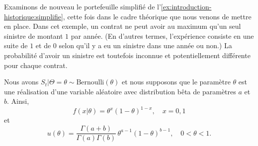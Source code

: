 \begin{exemple}
  \label{ex:bayesienne:bernoulli-beta}
  Examinons de nouveau le portefeuille simplifié de
  l'\autoref{ex:introduction-historique:simplifie}, cette fois dans le
  cadre théorique que nous venons de mettre en place. Dans cet
  exemple, un contrat ne peut avoir au maximum qu'un seul sinistre de
  montant $1$ par année. (En d'autres termes, l'expérience consiste en
  une suite de $1$ et de $0$ selon qu'il y a eu un sinistre dans une
  année ou non.) La probabilité d'avoir un sinistre est toutefois
  inconnue et potentiellement différente pour chaque contrat.

  Nous avons $S_t|\Theta = \theta \sim \text{Bernoulli}(\theta)$ et
  nous supposons que le paramètre $\theta$ est une réalisation d'une
  variable aléatoire avec distribution bêta de paramètres $a$ et
  $b$. Ainsi,
  \begin{equation*}
    f(x|\theta) = \theta^x (1 - \theta)^{1 - x},
    \quad x = 0, 1
  \end{equation*}
  et
  \begin{equation*}
    u(\theta)
    = \frac{\Gamma(a + b)}{\Gamma(a) \Gamma(b)}\,
    \theta^{a - 1} (1 - \theta)^{b - 1},
    \quad 0 < \theta < 1.
  \end{equation*}


\end{exemple}

